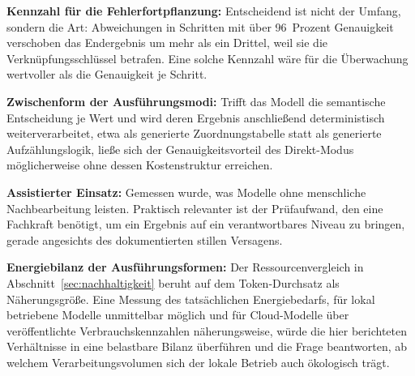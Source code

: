 \noindent\textbf{Kennzahl für die Fehlerfortpflanzung:} Entscheidend ist nicht der Umfang, sondern die Art: Abweichungen in Schritten mit über 96~Prozent Genauigkeit verschoben das Endergebnis um mehr als ein Drittel, weil sie die Verknüpfungsschlüssel betrafen. Eine solche Kennzahl wäre für die Überwachung wertvoller als die Genauigkeit je Schritt.

\noindent\textbf{Zwischenform der Ausführungsmodi:} Trifft das Modell die semantische Entscheidung je Wert und wird deren Ergebnis anschließend deterministisch weiterverarbeitet, etwa als generierte Zuordnungstabelle statt als generierte Aufzählungslogik, ließe sich der Genauigkeitsvorteil des Direkt-Modus möglicherweise ohne dessen Kostenstruktur erreichen.

\noindent\textbf{Assistierter Einsatz:} Gemessen wurde, was Modelle ohne menschliche Nachbearbeitung leisten. Praktisch relevanter ist der Prüfaufwand, den eine Fachkraft benötigt, um ein Ergebnis auf ein verantwortbares Niveau zu bringen, gerade angesichts des dokumentierten stillen Versagens.

\noindent\textbf{Energiebilanz der Ausführungsformen:} Der Ressourcenvergleich in Abschnitt~\ref{sec:nachhaltigkeit} beruht auf dem Token-Durchsatz als Näherungsgröße. Eine Messung des tatsächlichen Energiebedarfs, für lokal betriebene Modelle unmittelbar möglich und für Cloud-Modelle über veröffentlichte Verbrauchskennzahlen näherungsweise, würde die hier berichteten Verhältnisse in eine belastbare Bilanz überführen und die Frage beantworten, ab welchem Verarbeitungsvolumen sich der lokale Betrieb auch ökologisch trägt.
